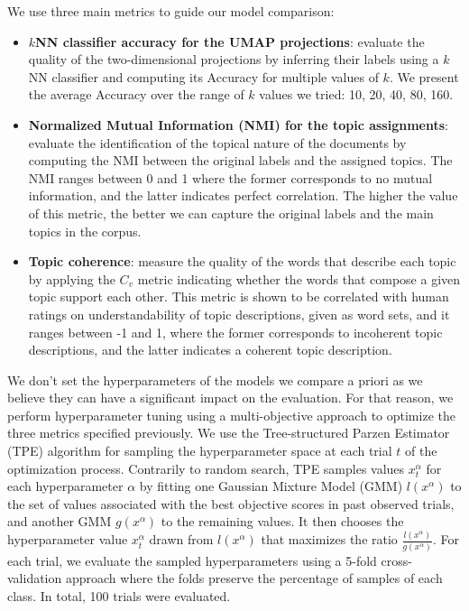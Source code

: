 \documentclass[a4paper]{article}
\begin{document}
We use three main metrics to guide our model comparison: 
\begin{itemize}
  \item \textbf{$k$NN classifier accuracy for the UMAP projections}: evaluate the quality of the two-dimensional projections by inferring their labels using a $k$NN classifier and computing its Accuracy for multiple values of $k$. We present the average Accuracy over the range of $k$ values we tried: 10, 20, 40, 80, 160.
  \item \textbf{Normalized Mutual Information (NMI) for the topic assignments}: evaluate the identification of the topical nature of the documents by computing the NMI between the original labels and the assigned topics. The NMI ranges between 0 and 1 where the former corresponds to no mutual information, and the latter indicates perfect correlation. The higher the value of this metric, the better we can capture the original labels and the main topics in the corpus.
  \item \textbf{Topic coherence}: measure the quality of the words that describe each topic by applying the $C_v$ metric \citep{roder2015} indicating whether the words that compose a given topic support each other. This metric is shown to be correlated with human ratings on understandability of topic descriptions, given as word sets, and it ranges between -1 and 1, where the former corresponds to incoherent topic descriptions, and the latter indicates a coherent topic description.
\end{itemize}

We don't set the hyperparameters of the models we compare a priori as we believe they can have a significant impact on the evaluation. For that reason, we perform hyperparameter tuning using a multi-objective approach to optimize the three metrics specified previously. We use the Tree-structured Parzen Estimator (TPE) algorithm \citep{bergstra2011, ozaki2020} for sampling the hyperparameter space at each trial $t$ of the optimization process. Contrarily to random search, TPE samples values $x_t^\alpha$ for each hyperparameter $\alpha$ by fitting one Gaussian Mixture Model (GMM) $l(x^\alpha)$ to the set of values associated with the best objective scores in past observed trials, and another GMM $g(x^\alpha)$ to the remaining values. It then chooses the hyperparameter value $x_t^\alpha$ drawn from $l(x^\alpha)$ that maximizes the ratio $\frac{l(x^\alpha)}{g(x^\alpha)}$. For each trial, we evaluate the sampled hyperparameters using a 5-fold cross-validation approach where the folds preserve the percentage of samples of each class. In total, 100 trials were evaluated.
\end{document}
